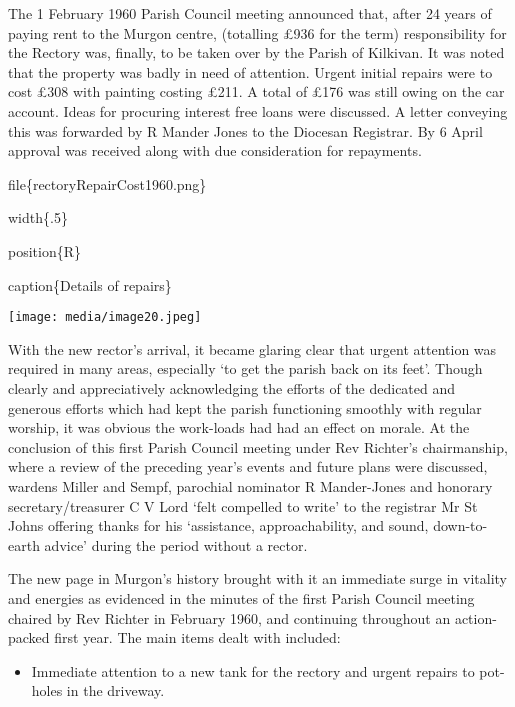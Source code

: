 The 1 February 1960 Parish Council meeting announced that, after 24
years of paying rent to the Murgon centre, (totalling £936 for the term)
responsibility for the Rectory was, finally, to be taken over by the
Parish of Kilkivan. It was noted that the property was badly in need of
attention. Urgent initial repairs were to cost £308 with painting
costing £211. A total of £176 was still owing on the car account. Ideas
for procuring interest free loans were discussed. A letter conveying
this was forwarded by R Mander Jones to the Diocesan Registrar. By 6
April approval was received along with due consideration for repayments.

file\{rectoryRepairCost1960.png\}

width\{.5\}

position\{R\}

caption\{Details of repairs\}

\texttt{[image: media/image20.jpeg]}

With the new rector's arrival, it became glaring clear that urgent
attention was required in many areas, especially `to get the parish back
on its feet'. Though clearly and appreciatively acknowledging the
efforts of the dedicated and generous efforts which had kept the parish
functioning smoothly with regular worship, it was obvious the work-loads
had had an effect on morale. At the conclusion of this first Parish
Council meeting under Rev Richter's chairmanship, where a review of the
preceding year's events and future plans were discussed, wardens Miller
and Sempf, parochial nominator R Mander-Jones and honorary
secretary/treasurer C V Lord `felt compelled to write' to the registrar
Mr St Johns offering thanks for his `assistance, approachability, and
sound, down-to-earth advice' during the period without a rector.

The new page in Murgon's history brought with it an immediate surge in
vitality and energies as evidenced in the minutes of the first Parish
Council meeting chaired by Rev Richter in February 1960, and continuing
throughout an action-packed first year. The main items dealt with
included:

\begin{itemize}
\item
  Immediate attention to a new tank for the rectory and urgent repairs
  to pot-holes in the driveway.
\end{itemize}

